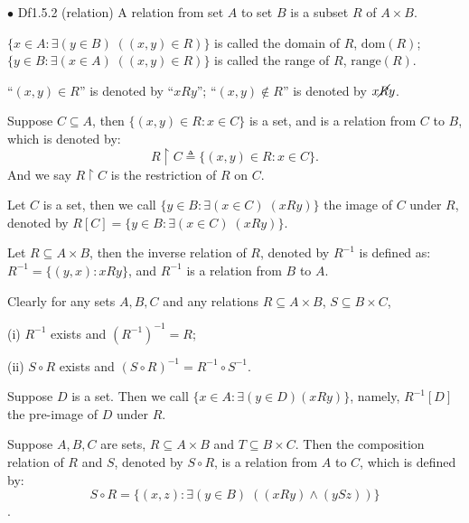 \documentclass{article}
\begin{document}
\begin{Df}{$\bullet$ Df1.5.2 (relation)}
    A relation from set $A$ to set $B$ is a subset $R$ of $A\times B$.
\end{Df}
\begin{compactitem}
    \item \textcolor{Df}{$\{x\in A: \exists (y\in B)\;((x,y)\in R)\}$ is called the domain of $R$, $\text{dom}(R)$; $\{y\in B: \exists (x\in A)\;((x,y)\in R)\}$ is called the range of $R$, $\text{range}(R)$.}
    \item \textcolor{Df}{``$(x,y)\in R$'' is denoted by ``$xRy$''; ``$(x,y)\notin R$'' is denoted by $x\cancel{R} y$.}
    \item \textcolor{Df}{Suppose $C\subseteq A$, then $\{(x,y)\in R: x\in C\}$ is a set, and is a relation from $C$ to $B$, which is denoted by: $$R\upharpoonright C \triangleq \{(x,y)\in R: x\in C\}.$$ And we say $R\upharpoonright C$ is the restriction of $R$ on $C$.} 
    \item \textcolor{Df}{Let $C$ is a set, then we call $\{y\in B: \exists (x\in C)\;(xRy)\}$ the image of $C$ under $R$, denoted by $R[C] = \{y\in B: \exists (x\in C)\;(xRy)\}$.}
    \item \textcolor{Df}{Let $R\subseteq A\times B$, then the inverse relation of $R$, denoted by $R^{-1}$ is defined as: $R^{-1} = \{(y,x): xRy\}$, and $R^{-1}$ is a relation from $B$ to $A$.}
    \item \textcolor{Th}{Clearly for any sets $A, B, C$ and any relations $R\subseteq A\times B$, $S\subseteq B\times C$, 
    \begin{compactenum}
        \item[(i)] $R^{-1}$ exists and $(R^{-1})^{-1} = R$;
        \item[(ii)] $S\circ R$ exists and $(S\circ R)^{-1} = R^{-1}\circ S^{-1}$. 
    \end{compactenum}
    }
    \item \textcolor{Df}{Suppose $D$ is a set. Then we call $\{x\in A: \exists (y\in D) (xRy)\}$, namely, $R^{-1}[D]$ the pre-image of $D$ under $R$.}
    \item \textcolor{Df}{Suppose $A,B,C$ are sets, $R\subseteq A\times B$ and $T\subseteq B\times C$. Then the composition relation of $R$ and $S$, denoted by $S\circ R$, is a relation from $A$ to $C$, which is defined by:$$S\circ R = \{(x,z): \exists (y\in B)\; ((xRy)\land (ySz))\}$$.}
\end{compactitem}
\end{document}
